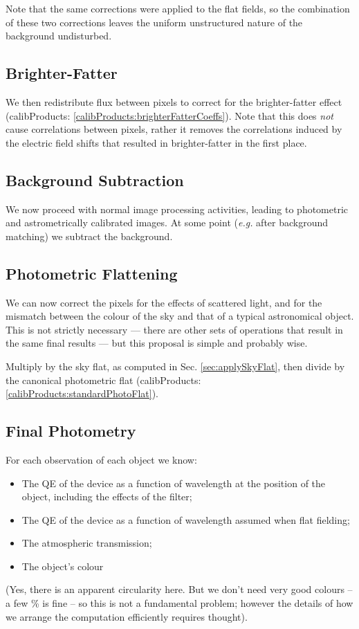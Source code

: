 \documentclass[12pt]{article}
\newcommand{\eg}{\textit{e.g.}\xspace}
\newcommand{\outputData}[1]{(calibProducts: \ref{calibProducts:#1})}
\newcommand{\secRef}[1]{Sec. \ref{sec:#1}}
\begin{document}
Note that the same corrections were applied to the flat fields, so the combination of these
two corrections leaves the uniform unstructured nature of the background undisturbed.

\subsection{Brighter-Fatter}

We then redistribute flux between pixels to correct for the brighter-fatter effect
\outputData{brighterFatterCoeffs}.  Note that this does \textit{not} cause correlations between pixels, rather
it removes the correlations induced by the electric field shifts that resulted in brighter-fatter in the first
place.

\subsection{Background Subtraction}

We now proceed with normal image processing activities, leading to photometric and astrometrically
calibrated images.  At some point (\eg after background matching) we subtract the background.

\subsection{Photometric Flattening}

We can now correct the pixels for the effects of scattered light, and for the mismatch between the
colour of the sky and that of a typical astronomical object.  This is not strictly necessary --- there
are other sets of operations that result in the same final results --- but this proposal is simple
and probably wise.

Multiply by the sky flat, as computed in \secRef{applySkyFlat}, then divide by the canonical
photometric flat \outputData{standardPhotoFlat}.

\subsection{Final Photometry}
\label{sec:finalPhotometry}

For each observation of each object we know:
\begin{itemize}
\item The QE of the device as a function of wavelength at the position of the object,
  including the effects of the filter;
\item The QE of the device as a function of wavelength assumed when flat fielding;
\item The atmospheric transmission;
\item The object's colour
\end{itemize}
(Yes, there is an apparent circularity here.  But we don't need very good colours -- a few \% is fine -- so
this is not a fundamental problem;  however the details of how we arrange the computation efficiently
requires thought).
\end{document}

